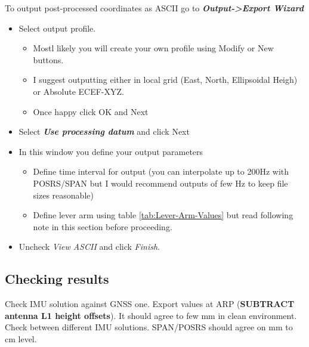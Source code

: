 \documentclass[british]{book}
\begin{document}
To output post-processed coordinates as ASCII go to \textbf{\emph{Output->Export Wizard}} 	
\begin{itemize}
	\item Select output profile. 
	\begin{itemize}
		\item Mostl likely you will create your own profile using Modify or New buttons.
		\item I suggest outputting either in local grid (East, North, Ellipsoidal Heigh) or Absolute ECEF-XYZ.
		\item Once happy click OK and Next
	\end{itemize}
	\item Select \textbf{\emph{Use processing datum}} and click Next
	\item In this window you define your output parameters
	\begin{itemize}
		\item Define time interval for output (you can interpolate up to 200Hz with POSRS/SPAN but I would recommend outputs of few Hz to keep file sizes reasonable)
		\item Define lever arm using table \ref{tab:Lever-Arm-Values} but read following note in this section before proceeding. 
	\end{itemize}
	
	
	
	\item Uncheck \emph{View ASCII} and click \emph{Finish}.
\end{itemize}




\subsection{Checking results}
Check IMU solution against GNSS one. Export values at ARP (\textbf{SUBTRACT antenna L1 height offsets}). It should agree to few mm in clean environment.  Check between different IMU solutions. SPAN/POSRS should agree on mm to cm level.
\end{document}
